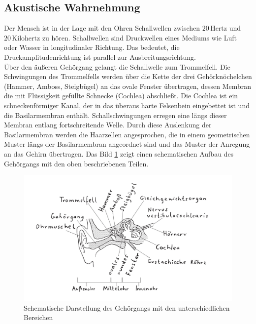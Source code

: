 \subsection{Akustische Wahrnehmung}
Der Mensch ist in der Lage mit den Ohren Schallwellen zwischen $ 20\,\mathrm{Hertz} $ und $ 20\,\mathrm{Kilohertz} $ zu hören. Schallwellen sind Druckwellen eines Mediums wie Luft oder Wasser in longitudinaler Richtung. Das bedeutet, die Druckamplitudenrichtung ist parallel zur Ausbreitungsrichtung. \cite[Vgl. Seite 217]{Schonhammer.2013} \\
\glqq Über den äußeren Gehörgang gelangt die Schallwelle zum Trommelfell. Die Schwingungen des Trommelfells werden über die Kette der drei Gehörknöchelchen (Hammer, Amboss, Steigbügel) an das ovale Fenster übertragen, dessen Membran die mit Flüssigkeit gefüllte Schnecke (Cochlea) abschließt. Die Cochlea ist ein schneckenförmiger Kanal, der in das überaus harte Felsenbein eingebettet ist und die Basilarmembran enthält. Schallschwingungen erregen eine längs dieser Membran entlang fortschreitende Welle. Durch diese Auslenkung der Basilarmembran werden die Haarzellen angesprochen, die in einem geometrischen Muster längs der Basilarmembran angeordnet sind und das Muster der Anregung an das Gehirn übertragen. \grqq{} \cite[Seite 71f.]{Bernstein.2019}
Das Bild \ref{fig:Ohr} zeigt einen schematischen Aufbau des Gehörgangs mit den oben beschriebenen Teilen.
\begin{figure}[hbt]
	\centering
	\includegraphics[width=0.7\linewidth]{images/Ohr}
	\caption[Schematische Darstellung des Gehörgangs mit den unterschiedlichen Bereichen]{Schematische Darstellung des Gehörgangs mit den unterschiedlichen Bereichen \cite[Seite 219]{Schonhammer.2013}}
	\label{fig:Ohr}
\end{figure}
